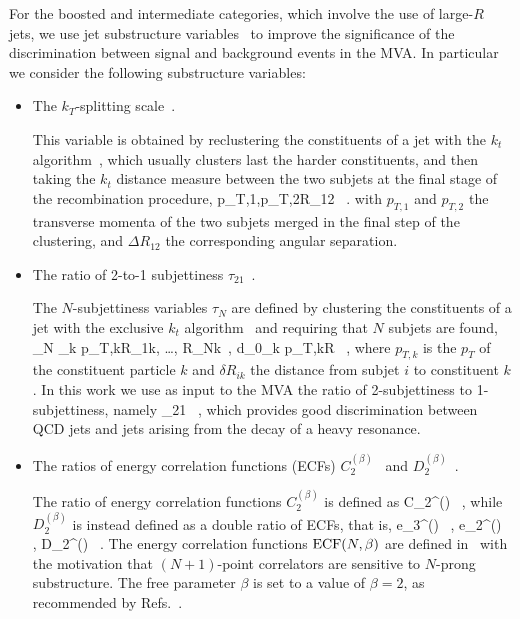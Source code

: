 For the   boosted and intermediate categories,
which involve the use of large-$R$ jets,
we use jet substructure variables~\cite{Salam:2009jx,Aad:2013gja} to
improve the significance of the discrimination between signal and background
events in the MVA.
%
In particular we  consider the following
substructure variables:
\begin{itemize}
\item The $k_T$-splitting scale~\cite{Butterworth:2002tt,Butterworth:2008iy}.

  This variable is obtained by reclustering the constituents of a jet with the
  $k_t$ algorithm~\cite{Ellis:1993tq},
  which usually clusters last the harder constituents, and then
  taking the $k_t$ distance measure between the two subjets at the final stage of the recombination
  procedure,
  \be
  \label{eq:ktsplitting}
 \lp p_{T,1},p_{T,2}\rp \cdot \Delta R_{12} \, .
\ee
with $p_{T,1}$ and $p_{T,2}$ the transverse momenta of the two subjets merged
in the final step of the clustering, and $\Delta R_{12}$ the corresponding
angular separation.
  
\item The ratio of 2-to-1 subjettiness $\tau_{21}$~\cite{Thaler:2010tr,Thaler:2011gf}.

  The $N$-subjettiness variables $\tau_N$ are defined by clustering the constituents
  of a jet with the exclusive $k_t$ algorithm~\cite{Catani:1993hr}
  and requiring that $N$ subjets are found,
  \be
  \tau_N \equiv {} \sum_k p_{T,k}\lp \delta R_{1k}, \ldots,
  \delta R_{Nk}\rp \, , \qquad d_0\equiv \sum_k p_{T,k}\cdot R \, ,
  \ee
  where $p_{T,k}$ is the $p_T$ of the constituent particle $k$ and $\delta R_{ik}$ the distance from
  subjet $i$ to constituent $k$.
  In this work we use as input to the MVA the ratio of 2-subjettiness to 1-subjettiness, namely
  \be
  \label{eq:tau21}
\tau_{21} \equiv {} \, ,
  \ee
  which provides good discrimination 
  between QCD jets and jets arising from the decay of
  a heavy resonance.
  
\item The ratios of energy correlation functions (ECFs)  $C^{(\beta)}_2$~\cite{Larkoski:2013eya} and
  $D_2^{(\beta)}$~\cite{Larkoski:2014gra}.

  The ratio of energy correlation functions $C_2^{(\beta)}$ is defined as
  \be
  \label{eq:c2}
C_2^{(\beta)} \equiv {} \, ,
\ee
while $D_2^{(\beta)}$ is instead defined as a double ratio of ECFs, that is,
\be
e_3^{(\beta)}\equiv {} \, , \quad
  e_2^{(\beta)}\equiv {} \, , \quad
  \label{eq:d2}
D_2^{(\beta)} \equiv {} \, .
\ee
The energy correlation functions ${\rm ECF}(N,\beta)$ are defined
  in~\cite{Larkoski:2013eya} with the motivation that $(N+1)$-point correlators
  are sensitive to $N$-prong substructure.
  The free parameter $\beta$ is set to a value of $\beta=2$,
  as recommended by Refs.~\cite{Larkoski:2013eya,Larkoski:2014gra}.
\end{itemize}



